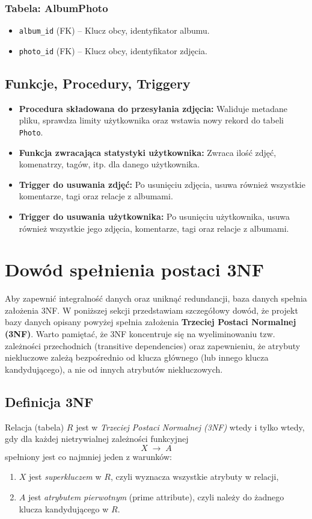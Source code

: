\documentclass[12pt,a4paper]{article}
\begin{document}
\subsubsection{Tabela: AlbumPhoto}
\begin{itemize}
    \item \texttt{album\_id} (FK) -- Klucz obcy, identyfikator albumu.
    \item \texttt{photo\_id} (FK) -- Klucz obcy, identyfikator zdjęcia.
\end{itemize}

\subsection{Funkcje, Procedury, Triggery}
\begin{itemize}
    \item \textbf{Procedura składowana do przesyłania zdjęcia:} Waliduje metadane pliku, sprawdza limity użytkownika oraz wstawia nowy rekord do tabeli \texttt{Photo}.
    \item \textbf{Funkcja zwracająca statystyki użytkownika:} Zwraca ilość zdjęć, komenatrzy, tagów, itp. dla danego użytkownika.
    \item \textbf{Trigger do usuwania zdjęć:} Po usunięciu zdjęcia, usuwa również wszystkie komentarze, tagi oraz relacje z albumami.
    \item \textbf{Trigger do usuwania użytkownika:} Po usunięciu użytkownika, usuwa również wszystkie jego zdjęcia, komentarze, tagi oraz relacje z albumami.
\end{itemize}

\section{Dowód spełnienia postaci 3NF}

Aby zapewnić integralność danych oraz uniknąć redundancji, baza danych spełnia założenia 3NF.
\newline
W poniższej sekcji przedstawiam szczegółowy dowód, że projekt bazy danych opisany powyżej spełnia założenia \textbf{Trzeciej Postaci Normalnej (3NF)}. Warto pamiętać, że 3NF koncentruje się na wyeliminowaniu tzw. zależności przechodnich (transitive dependencies) oraz zapewnieniu, że atrybuty niekluczowe zależą bezpośrednio od klucza głównego (lub innego klucza kandydującego), a nie od innych atrybutów niekluczowych.

\subsection{Definicja 3NF}
Relacja (tabela) \( R \) jest w \emph{Trzeciej Postaci Normalnej (3NF)} wtedy i tylko wtedy, gdy dla każdej nietrywialnej zależności funkcyjnej
\[
X \;\rightarrow\; A
\]
spełniony jest co najmniej jeden z warunków:
\begin{enumerate}
    \item \( X \) jest \emph{superkluczem} w \( R \), czyli wyznacza wszystkie atrybuty w relacji,
    \item \( A \) jest \emph{atrybutem pierwotnym} (prime attribute), czyli należy do żadnego klucza kandydującego w \( R \).
\end{enumerate}
\end{document}
